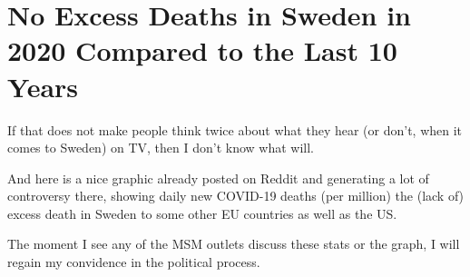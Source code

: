 \chapter{No Excess Deaths in Sweden in 2020 Compared to the Last 10 Years}

\begin{refsection}

If that does not make people think twice about what they hear (or don't, when it comes to Sweden) on TV, then I don't know what will.\textsuperscript{\cite{url19f6cac5}}

And here is a nice graphic already posted on Reddit and generating a lot of controversy there, showing daily new COVID-19 deaths (per million) the (lack of) excess death in Sweden to some other EU countries as well as the US.\textsuperscript{\cite{urlba11cec0}}

The moment I see any of the MSM outlets discuss these stats or the graph, I will regain my convidence in the political process.

\printbibliography[heading=subbibliography]

\end{refsection}